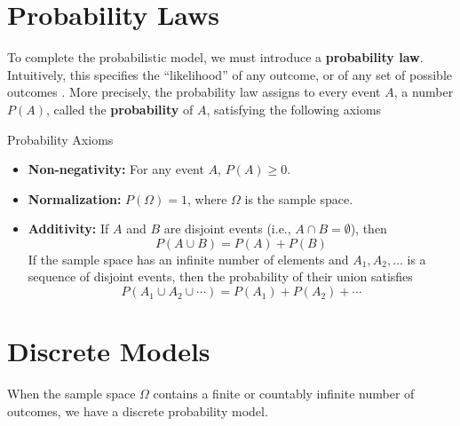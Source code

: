 \section{Probability Laws}
To complete the probabilistic model, we must introduce a \textbf{probability law}. Intuitively, this specifies the “likelihood” of any outcome, or of any set of possible outcomes . More precisely, the probability law assigns to every event \(A\), a number \(P(A)\), called the \textbf{probability} of \(A\), satisfying the following axioms 

\begin{definitionboxbreak}{Probability Axioms}
    \begin{itemize}
        \item \textbf{Non-negativity:} For any event \(A\), \(P(A) \geq 0\).
        \item \textbf{Normalization:} \(P(\Omega) = 1\), where \(\Omega\) is the sample space.
        \item \textbf{Additivity:} If \(A\) and \(B\) are disjoint events (i.e., \(A \cap B = \emptyset\)), then 
        \[ P(A \cup B) = P(A) + P(B)\]
        If the sample space has an infinite number of elements
and \(A_1, A_2, \ldots\) is a sequence of disjoint events, then the probability of
their union satisfies
\[ P(A_1 \cup A_2 \cup \cdots) = P(A_1) + P(A_2) + \cdots \]
    \end{itemize}
\end{definitionboxbreak}



\section{Discrete Models}

When the sample space \(\Omega\) contains a finite or countably infinite number of outcomes, we have a discrete probability model.

